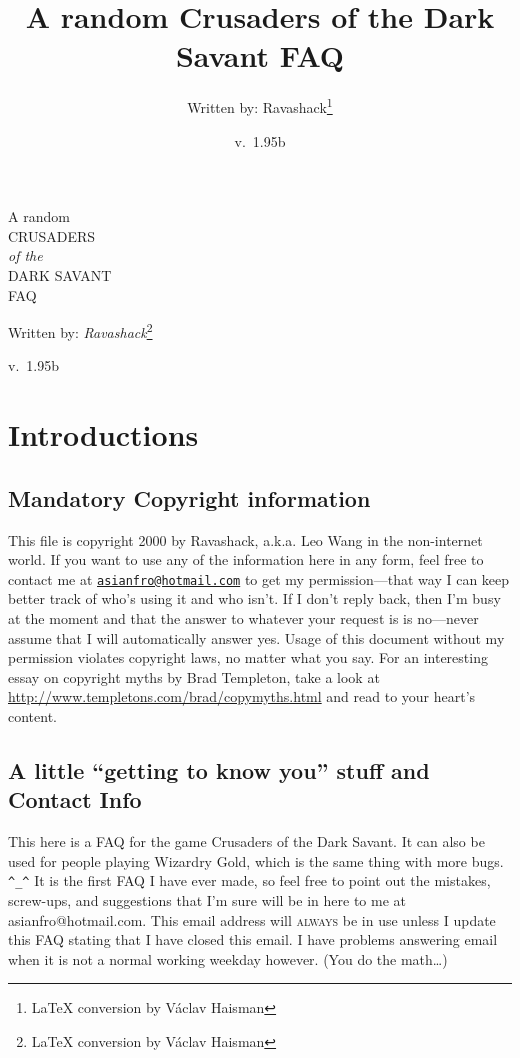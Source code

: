 \documentclass[11pt]{report}
\title{A random Crusaders of the Dark Savant FAQ}
\author{Written by: Ravashack\protect\footnote{\LaTeX{} conversion by Václav Haisman}}
\date{v.\ 1.95b}
\newcommand\textlcsc[1]{\texorpdfstring{\textsc{\MakeLowercase{#1}}}{#1}}
\begin{document}
\begin{titlepage}
  \centering
  {\Huge A random\\\uppercase{Crusaders}\\{\textit{of the}}\\\uppercase{Dark Savant}\\FAQ\par}
  \vspace{1.5cm}
  {\Large Written by: \textit{Ravashack}\protect\footnote{\LaTeX{} conversion by Václav Haisman}\par}
  \vspace{1.5cm}
  {\large v.\ 1.95b\par}
  \vfill


\end{titlepage}

\chapter{Introductions}%
%
\section{Mandatory Copyright
information}\label{mandatory-copyright-information}%
%
This file is copyright 2000 by Ravashack, a.k.a. Leo Wang in the non-internet
world. If you want to use any of the information here in any form, feel free
to contact me at
\href{mailto:asianfro@hotmail.com}{\nolinkurl{asianfro@hotmail.com}} to get
my permission---that way I can keep better track of who's using it and who
isn't. If I don't reply back, then I'm busy at the moment and that the answer
to whatever your request is is no---never assume that I will automatically
answer yes. Usage of this document without my permission violates copyright
laws, no matter what you say. For an interesting essay on copyright myths by
Brad Templeton, take a look at
\url{http://www.templetons.com/brad/copymyths.html} and read to your heart's
content.

\section{\texorpdfstring{A little ``getting to know you'' stuff and
Contact
Info}{A little getting to know you stuff and Contact Info}}\label{a-little-getting-to-know-you-stuff-and-contact-info}%
%
This here is a FAQ for the game Crusaders of the Dark Savant. It can also be
used for people playing Wizardry Gold, which is the same thing with more
bugs. \verb|^_^| It is the first FAQ I have ever made, so feel free
to point out the mistakes, screw-ups, and suggestions that I'm sure will be
in here to me at asianfro@hotmail.com. This email address will
\textlcsc{ALWAYS} be in use unless I update this FAQ stating that I have
closed this email. I have problems answering email when it is not a normal
working weekday however. (You do the math\ldots{})
\end{document}

